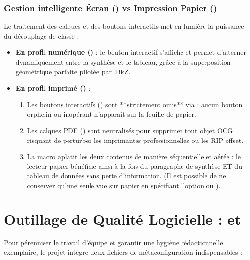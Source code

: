 \subsubsection[Gestion intelligente Écran vs Impression]{Gestion intelligente Écran () vs Impression Papier ()}
Le traitement des calques et des boutons interactifs met en lumière la puissance du découplage de classe :
\begin{itemize}
  \item \textbf{En profil numérique ()} :
  le bouton interactif s'affiche et permet d'alterner dynamiquement entre la synthèse et le tableau, grâce à la superposition géométrique parfaite  pilotée par TikZ.
  \item \textbf{En profil imprimé ()} :
  \begin{enumerate}
    \item Les boutons interactifs () sont **strictement omis** via  : aucun bouton orphelin ou inopérant n'apparaît sur la feuille de papier.
    \item Les calques PDF () sont neutralisés pour supprimer tout objet OCG risquant de perturber les imprimantes professionnelles ou les RIP offset.
    \item La macro  aplatit les deux contenus de manière séquentielle et aérée : le lecteur papier bénéficie ainsi à la fois du paragraphe de synthèse ET du tableau de données sans perte d'information.
    (Il est possible de ne conserver qu'une seule vue sur papier en spécifiant l'option  ou ).
  \end{enumerate}
\end{itemize}

\section{Outillage de Qualité Logicielle :  et }
\label{sec:qualite-outils}

Pour pérenniser le travail d'équipe et garantir une hygiène rédactionnelle exemplaire,
le projet intègre deux fichiers de métaconfiguration indispensables :

